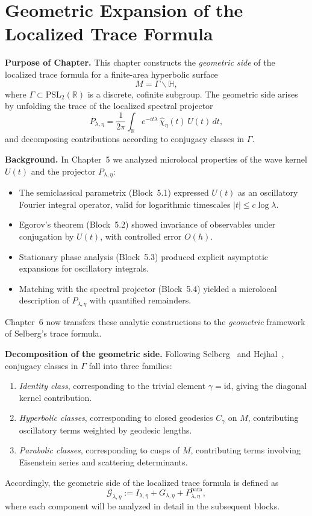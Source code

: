 
\chapter{Geometric Expansion of the Localized Trace Formula}

\noindent\textbf{Purpose of Chapter.}
This chapter constructs the \emph{geometric side} of the localized trace formula for a finite-area hyperbolic surface
\[
  M = \Gamma \backslash \mathbb{H},
\]
where $\Gamma \subset \mathrm{PSL}_2(\mathbb{R})$ is a discrete, cofinite subgroup.
The geometric side arises by unfolding the trace of the localized spectral projector
\[
  P_{\lambda,\eta} = \frac{1}{2\pi}\int_{\mathbb{R}} e^{-it\lambda}\,\widehat{\chi}_\eta(t)\, U(t)\,dt,
\]
and decomposing contributions according to conjugacy classes in $\Gamma$.

\medskip

\noindent\textbf{Background.}
In Chapter~5 we analyzed microlocal properties of the wave kernel $U(t)$ and the projector $P_{\lambda,\eta}$:
\begin{itemize}
  \item The semiclassical parametrix (Block~5.1) expressed $U(t)$ as an oscillatory Fourier integral operator, valid for logarithmic timescales $|t|\le c\log\lambda$.
  \item Egorov’s theorem (Block~5.2) showed invariance of observables under conjugation by $U(t)$, with controlled error $O(h)$.
  \item Stationary phase analysis (Block~5.3) produced explicit asymptotic expansions for oscillatory integrals.
  \item Matching with the spectral projector (Block~5.4) yielded a microlocal description of $P_{\lambda,\eta}$ with quantified remainders.
\end{itemize}
Chapter~6 now transfers these analytic constructions to the \emph{geometric} framework of Selberg’s trace formula.

\medskip

\noindent\textbf{Decomposition of the geometric side.}
Following Selberg~\cite{Selberg1956} and Hejhal~\cite{Hejhal1983}, conjugacy classes in $\Gamma$ fall into three families:
\begin{enumerate}
  \item \emph{Identity class}, corresponding to the trivial element $\gamma = \mathrm{id}$, giving the diagonal kernel contribution.
  \item \emph{Hyperbolic classes}, corresponding to closed geodesics $C_\gamma$ on $M$, contributing oscillatory terms weighted by geodesic lengths.
  \item \emph{Parabolic classes}, corresponding to cusps of $M$, contributing terms involving Eisenstein series and scattering determinants.
\end{enumerate}
Accordingly, the geometric side of the localized trace formula is defined as
\[
  \mathcal{G}_{\lambda,\eta}
  := I_{\lambda,\eta} + G_{\lambda,\eta} + P^{\mathrm{para}}_{\lambda,\eta},
\]
where each component will be analyzed in detail in the subsequent blocks.

